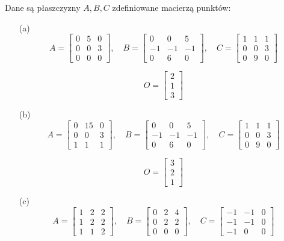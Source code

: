 Dane są płaszczyzny \( A, B, C \) zdefiniowane macierzą punktów:

\begin{enumerate}
    \item[(a)] 
    \[
    A = \begin{bmatrix} 0 & 5 & 0 \\ 0 & 0 & 3 \\ 0 & 0 & 0 \end{bmatrix}, \quad
    B = \begin{bmatrix} 0 & 0 & 5 \\ -1 & -1 & -1 \\ 0 & 6 & 0 \end{bmatrix}, \quad
    C = \begin{bmatrix} 1 & 1 & 1 \\ 0 & 0 & 3 \\ 0 & 9 & 0 \end{bmatrix}
    \]
    
    \[
    O = \begin{bmatrix} 2 \\ 1 \\ 3 \end{bmatrix}
    \]

    \item[(b)] 
    \[
    A = \begin{bmatrix} 0 & 15 & 0 \\ 0 & 0 & 3 \\ 1 & 1 & 1 \end{bmatrix}, \quad
    B = \begin{bmatrix} 0 & 0 & 5 \\ -1 & -1 & -1 \\ 0 & 6 & 0 \end{bmatrix}, \quad
    C = \begin{bmatrix} 1 & 1 & 1 \\ 0 & 0 & 3 \\ 0 & 9 & 0 \end{bmatrix}
    \]
    
    \[
    O = \begin{bmatrix} 3 \\ 2 \\ 1 \end{bmatrix}
    \]

    \item[(c)] 
    \[
    A = \begin{bmatrix} 1 & 2 & 2 \\ 1 & 2 & 2 \\ 1 & 1 & 2 \end{bmatrix}, \quad
    B = \begin{bmatrix} 0 & 2 & 4 \\ 0 & 2 & 2 \\ 0 & 0 & 0 \end{bmatrix}, \quad
    C = \begin{bmatrix} -1 & -1 & 0 \\ -1 & -1 & 0 \\ -1 & 0 & 0 \end{bmatrix}
    \]
    

\end{enumerate}
